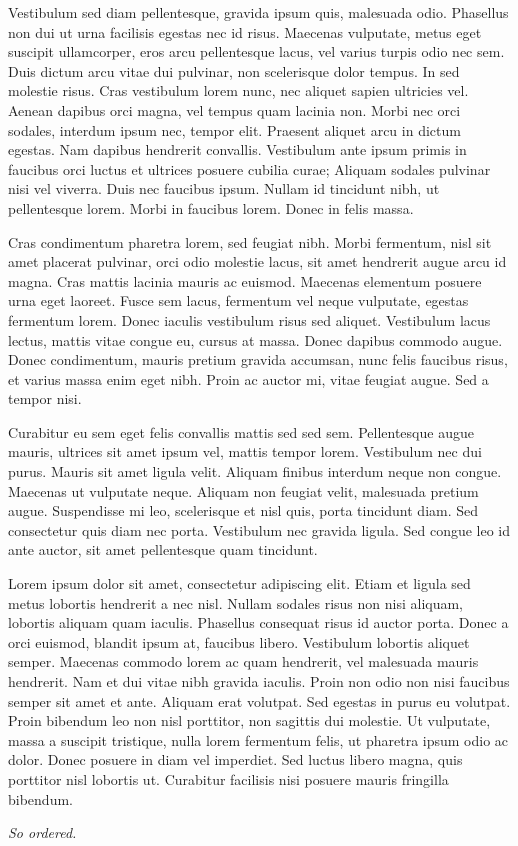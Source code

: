 \documentclass[11pt,twoside]{article}
\begin{document}
Vestibulum sed diam pellentesque, gravida ipsum quis, malesuada odio. Phasellus non dui ut urna facilisis egestas nec id risus. Maecenas vulputate, metus eget suscipit ullamcorper, eros arcu pellentesque lacus, vel varius turpis odio nec sem. Duis dictum arcu vitae dui pulvinar, non scelerisque dolor tempus. In sed molestie risus. Cras vestibulum lorem nunc, nec aliquet sapien ultricies vel. Aenean dapibus orci magna, vel tempus quam lacinia non. Morbi nec orci sodales, interdum ipsum nec, tempor elit. Praesent aliquet arcu in dictum egestas. Nam dapibus hendrerit convallis. Vestibulum ante ipsum primis in faucibus orci luctus et ultrices posuere cubilia curae; Aliquam sodales pulvinar nisi vel viverra. Duis nec faucibus ipsum. Nullam id tincidunt nibh, ut pellentesque lorem. Morbi in faucibus lorem. Donec in felis massa.

Cras condimentum pharetra lorem, sed feugiat nibh. Morbi fermentum, nisl sit amet placerat pulvinar, orci odio molestie lacus, sit amet hendrerit augue arcu id magna. Cras mattis lacinia mauris ac euismod. Maecenas elementum posuere urna eget laoreet. Fusce sem lacus, fermentum vel neque vulputate, egestas fermentum lorem. Donec iaculis vestibulum risus sed aliquet. Vestibulum lacus lectus, mattis vitae congue eu, cursus at massa. Donec dapibus commodo augue. Donec condimentum, mauris pretium gravida accumsan, nunc felis faucibus risus, et varius massa enim eget nibh. Proin ac auctor mi, vitae feugiat augue. Sed a tempor nisi.

Curabitur eu sem eget felis convallis mattis sed sed sem. Pellentesque augue mauris, ultrices sit amet ipsum vel, mattis tempor lorem. Vestibulum nec dui purus. Mauris sit amet ligula velit. Aliquam finibus interdum neque non congue. Maecenas ut vulputate neque. Aliquam non feugiat velit, malesuada pretium augue. Suspendisse mi leo, scelerisque et nisl quis, porta tincidunt diam. Sed consectetur quis diam nec porta. Vestibulum nec gravida ligula. Sed congue leo id ante auctor, sit amet pellentesque quam tincidunt. 

Lorem ipsum dolor sit amet, consectetur adipiscing elit. Etiam et ligula sed metus lobortis hendrerit a nec nisl. Nullam sodales risus non nisi aliquam, lobortis aliquam quam iaculis. Phasellus consequat risus id auctor porta. Donec a orci euismod, blandit ipsum at, faucibus libero. Vestibulum lobortis aliquet semper. Maecenas commodo lorem ac quam hendrerit, vel malesuada mauris hendrerit. Nam et dui vitae nibh gravida iaculis. Proin non odio non nisi faucibus semper sit amet et ante. Aliquam erat volutpat. Sed egestas in purus eu volutpat. Proin bibendum leo non nisl porttitor, non sagittis dui molestie. Ut vulputate, massa a suscipit tristique, nulla lorem fermentum felis, ut pharetra ipsum odio ac dolor. Donec posuere in diam vel imperdiet. Sed luctus libero magna, quis porttitor nisl lobortis ut. Curabitur facilisis nisi posuere mauris fringilla bibendum.

\bigskip
{\flushright \itshape So ordered.\par}
\end{document}
